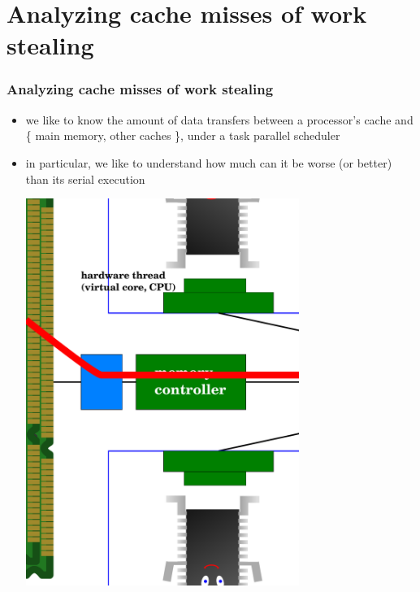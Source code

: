 \documentclass[12pt,dvipdfmx]{beamer}
\begin{document}
\section{Analyzing cache misses of work stealing}
\begin{frame}[fragile]
\frametitle{Analyzing cache misses of work stealing}
\begin{itemize}

\item<1-> we like to know the amount of data transfers
  between a processor's cache and \{ main memory,
  other caches \}, under a task parallel scheduler

\item<2-> in particular, we like to understand how much can it be
worse (or better) than its serial execution 

\begin{center}
\includegraphics[width=0.7\textwidth]{out/pdf/svg/ws_cache_goals.pdf}
\end{center}
\end{itemize}
\end{frame}
\end{document}
